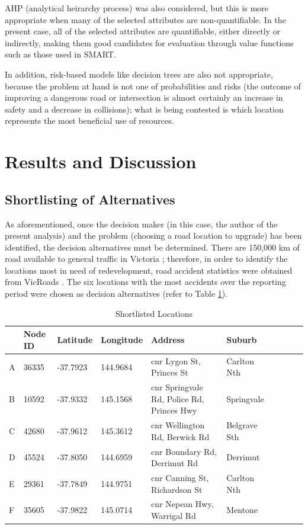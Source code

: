 \documentclass[11pt, a4paper]{article}
\begin{document}
    AHP (analytical heirarchy process) was also considered, but this is more appropriate when many of the selected attributes are non-quantifiable. In the present case, all of the selected attributes are quantifiable, either directly or indirectly, making them good candidates for evaluation through value functions such as those used in SMART.

    In addition, risk-based models like decision trees are also not appropriate, because the problem at hand is not one of probabilities and risks (the outcome of improving a dangerous road or intersection is almost certainly an increase in safety and a decrease in collisions); what is being contested is which location represents the most beneficial use of resources.

    \section{Results and Discussion}

    \subsection{Shortlisting of Alternatives}

    As aforementioned, once the decision maker (in this case, the author of the present analysis) and the problem (choosing a road location to upgrade) has been identified, the decision alternatives must be determined. There are 150,000 km of road available to general traffic in Victoria \parencite{a14}; therefore, in order to identify the locations most in need of redevelopment, road accident statistics were obtained from VicRoads \parencite{a3}. The six locations with the most accidents over the reporting period were chosen as decision alternatives (refer to Table \ref{t4}).

    \begin{table}[!ht]
        \centering
        \begin{tabular}{|l|l|l|l|l|l|l|l|l|l|}
        \hline
            ~ & Node ID & Latitude & Longitude & Address    & Suburb   \\ \hline
            A & 36335 & -37.7923 & 144.9684 & cnr Lygon St, Princes St    & Carlton Nth   \\ \hline
            B & 10592 & -37.9332 & 145.1568 & cnr Springvale Rd, Police Rd, Princes Hwy    & Springvale   \\ \hline
            C & 42680 & -37.9612 & 145.3612 & cnr Wellington Rd, Berwick Rd    & Belgrave Sth   \\ \hline
            D & 45524 & -37.8050 & 144.6959 & cnr Boundary Rd, Derrimut Rd    & Derrimut   \\ \hline
            E & 29361 & -37.7849 & 144.9751 & cnr Canning St, Richardson St    & Carlton Nth   \\ \hline
            F & 35605 & -37.9822 & 145.0714 & cnr Nepean Hwy, Warrigal Rd    & Mentone   \\ \hline
        \end{tabular}
        \caption{Shortlisted Locations}
        \label{t4}
    \end{table}
\end{document}
